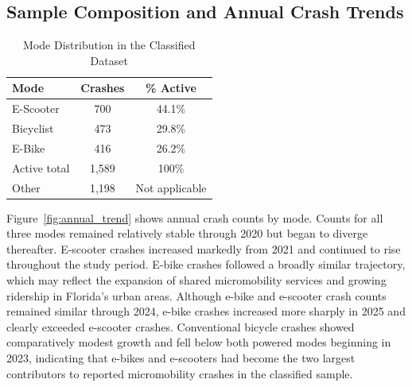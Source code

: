 \documentclass[numbered]{trbunofficial}
\begin{document}
\subsection{Sample Composition and Annual Crash Trends}
\begin{table}
\centering
\caption{Mode Distribution in the Classified Dataset}
\label{tab:mode_dist}
\begin{tabular}{lcc}
\toprule
\textbf{Mode} & \textbf{Crashes} & \textbf{\% Active} \\
\midrule
E-Scooter & 700 & 44.1\% \\
Bicyclist & 473 & 29.8\% \\
E-Bike    & 416 & 26.2\% \\
\midrule
Active total & 1,589 & 100\% \\
Other        & 1,198 & Not applicable  \\
\bottomrule
\end{tabular}
\end{table}

Figure~\ref{fig:annual_trend} shows annual crash counts by mode. Counts for all three modes remained relatively stable through 2020 but began to diverge thereafter. E-scooter crashes increased markedly from 2021 and continued to rise throughout the study period. E-bike crashes followed a broadly similar trajectory, which may reflect the expansion of shared micromobility services and growing ridership in Florida's urban areas. Although e-bike and e-scooter crash counts remained similar through 2024, e-bike crashes increased more sharply in 2025 and clearly exceeded e-scooter crashes. Conventional bicycle crashes showed comparatively modest growth and fell below both powered modes beginning in 2023, indicating that e-bikes and e-scooters had become the two largest contributors to reported micromobility crashes in the classified sample.


\end{document}
